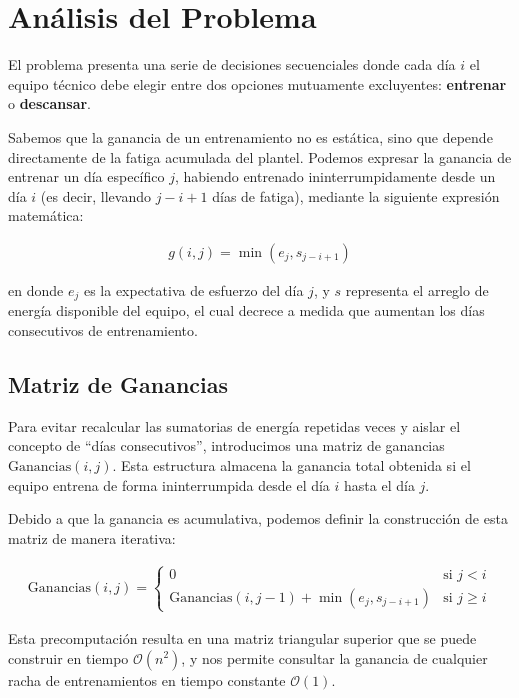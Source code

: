 \section{Análisis del Problema}

El problema presenta una serie de decisiones secuenciales donde cada día $i$ el equipo técnico debe elegir entre dos opciones mutuamente excluyentes: \textbf{entrenar} o \textbf{descansar}. 

Sabemos que la ganancia de un entrenamiento no es estática, sino que depende directamente de la fatiga acumulada del plantel. Podemos expresar la ganancia de entrenar un día específico $j$, habiendo entrenado ininterrumpidamente desde un día $i$ (es decir, llevando $j-i+1$ días de fatiga), mediante la siguiente expresión matemática:

\begin{eqnarray}
g(i, j) = \min(e_j, s_{j-i+1})
\label{ganancia-diaria}
\end{eqnarray}

en donde $e_j$ es la expectativa de esfuerzo del día $j$, y $s$ representa el arreglo de energía disponible del equipo, el cual decrece a medida que aumentan los días consecutivos de entrenamiento.

\subsection{Matriz de Ganancias}

Para evitar recalcular las sumatorias de energía repetidas veces y aislar el concepto de ``días consecutivos'', introducimos una matriz de ganancias $\text{Ganancias}(i, j)$. Esta estructura almacena la ganancia total obtenida si el equipo entrena de forma ininterrumpida desde el día $i$ hasta el día $j$.

Debido a que la ganancia es acumulativa, podemos definir la construcción de esta matriz de manera iterativa:

\begin{eqnarray}
\text{Ganancias}(i, j) = 
\begin{cases} 
0 & \text{si } j < i \\
\text{Ganancias}(i, j-1) + \min(e_j, s_{j-i+1}) & \text{si } j \geq i
\end{cases}
\label{matriz-Ganancias}
\end{eqnarray}

Esta precomputación resulta en una matriz triangular superior que se puede construir en tiempo $\mathcal{O}(n^2)$, y nos permite consultar la ganancia de cualquier racha de entrenamientos en tiempo constante $\mathcal{O}(1)$.

